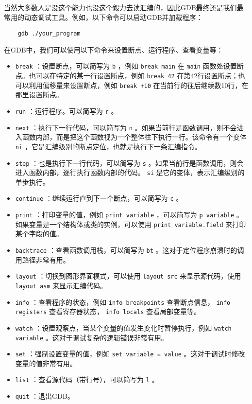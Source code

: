 当然大多数人是没这个能力也没这个毅力去读汇编的，因此GDB最终还是我们最常用的动态调试工具。例如，以下命令可以启动GDB并加载程序：
\begin{verbatim}
    gdb ./your_program
\end{verbatim}

在GDB中，我们可以使用以下命令来设置断点、运行程序、查看变量等：
\begin{itemize}
  \item  \texttt{break} ：设置断点，可以简写为 \texttt{b} ，例如 \texttt{break main} 在 \texttt{main} 函数处设置断点。也可以在特定的某一行设置断点，例如 \texttt{break 42} 在第42行设置断点；也可以利用偏移量来设置断点，例如 \texttt{break +10} 在当前行的往后继续数10行，在那里设置断点。
  \item  \texttt{run} ：运行程序。可以简写为 \texttt{r} 。
  \item  \texttt{next} ：执行下一行代码，可以简写为 \texttt{n} 。如果当前行是函数调用，则不会进入函数内部，而是把这个函数视为一个整体往下执行一行。该命令有一个变体 \texttt{ni} ，它是汇编级别的断点定位，也就是执行下一条汇编指令。
  \item  \texttt{step} ：也是执行下一行代码，可以简写为 \texttt{s} 。如果当前行是函数调用，则会进入函数内部，逐行执行函数内部的代码。 \texttt{si} 是它的变体，表示汇编级别的单步执行。
  \item  \texttt{continue} ：继续运行直到下一个断点，可以简写为 \texttt{c} 。
  \item  \texttt{print} ：打印变量的值，例如 \texttt{print variable} ，可以简写为 \texttt{p variable} 。如果变量是一个结构体或类的实例，可以使用 \texttt{print variable.field} 来打印某个字段的值。
  \item  \texttt{backtrace} ：查看函数调用栈，可以简写为 \texttt{bt} 。这对于定位程序崩溃时的调用路径非常有用。
  \item  \texttt{layout} ：切换到图形界面模式，可以使用 \texttt{layout src} 来显示源代码，使用 \texttt{layout asm} 来显示汇编代码。
  \item  \texttt{info} ：查看程序的状态，例如 \texttt{info breakpoints} 查看断点信息， \texttt{info registers} 查看寄存器状态， \texttt{info locals} 查看局部变量等。
  \item  \texttt{watch} ：设置观察点，当某个变量的值发生变化时暂停执行，例如 \texttt{watch variable} 。这对于调试复杂的逻辑错误非常有用。
  \item  \texttt{set} ：强制设置变量的值，例如 \texttt{set variable = value} 。这对于调试时修改变量的值非常有用。
  \item  \texttt{list} ：查看源代码（带行号），可以简写为 \texttt{l} 。
  \item  \texttt{quit} ：退出GDB。
\end{itemize}

